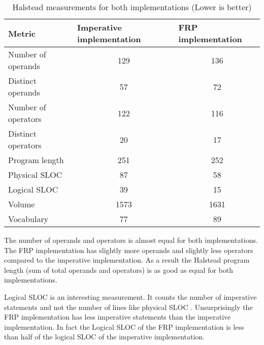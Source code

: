 \begin{table}[H]
	\centering
	\begin{tabular}{|l|c|c|}
		\hline
		\textbf{Metric} & \multicolumn{1}{l|}{\textbf{Imperative implementation}} & \multicolumn{1}{l|}{\textbf{FRP implementation}} \\ \hline
		Number of operands   & 129                                                     & 136                                              \\ \hline
		Distinct operands    & 57                                                      & 72                                               \\ \hline
		Number of operators  & 122                                                     & 116                                              \\ \hline
		Distinct operators   & 20                                                      & 17                                               \\ \hline
		Program length       & 251                                                     & 252                                              \\ \hline
		Physical SLOC        & 87                                                      & 58                                               \\ \hline
		Logical SLOC         & 39                                                      & 15                                               \\ \hline
		Volume               & 1573                                                    & 1631                                             \\ \hline
		Vocabulary           & 77                                                      & 89                                               \\ \hline
	\end{tabular}
	\caption{Halstead measurements for both implementations (Lower is better)}
	\label{table:hs}
\end{table}

The number of operands and operators is almost equal for both implementations. The FRP implementation has slightly more operands and slightly less operators compared to the imperative implementation. As a result the Halstead program length (sum of total operands and operators) is as good as equal for both implementations.

Logical SLOC is an interesting measurement. It counts the number of imperative statements and not the number of lines like physical SLOC \cite{complexity}. Unsurprisingly the FRP implementation has less imperative statements than the imperative implementation. In fact the Logical SLOC of the FRP implementation is less than half of the logical SLOC of the imperative implementation.

